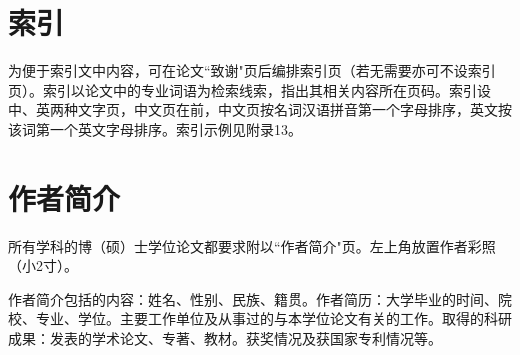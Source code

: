 \section{索引}\label{appendixA-11}

为便于索引文中内容，可在论文``致谢"页后编排索引页（若无需要亦可不设索引页）。索引以论文中的专业词语为检索线索，指出其相关内容所在页码。索引设中、英两种文字页，中文页在前，中文页按名词汉语拼音第一个字母排序，英文按该词第一个英文字母排序。索引示例见附录13。

\section{作者简介}\label{appendixA-12}

所有学科的博（硕）士学位论文都要求附以``作者简介"页。左上角放置作者彩照（小2寸）。

作者简介包括的内容：姓名、性别、民族、籍贯。作者简历：大学毕业的时间、院校、专业、学位。主要工作单位及从事过的与本学位论文有关的工作。取得的科研成果：发表的学术论文、专著、教材。获奖情况及获国家专利情况等。
